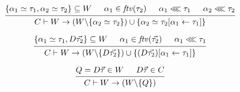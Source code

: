\documentclass[12pt]{article}
\begin{document}
\[
    \begin{prooftree}
        \hypo{\{\alpha_1 \simeq \tau_1, \alpha_2 \simeq \tau_2\} \subseteq W}
        \hypo{\alpha_1 \in \mathit{ftv}(\tau_2)}
        \hypo{\alpha_1 \lll \tau_1}
        \hypo{\alpha_2 \lll \tau_2}
        \infer4{C \vdash W \to (W \backslash \{\alpha_2 \simeq \tau_2\}) \cup \{\alpha_2 \simeq \tau_2[\alpha_1 \leftarrow \tau_1]\}}
    \end{prooftree}
\]

\[
    \begin{prooftree}
        \hypo{\{\alpha_1 \simeq \tau_1, D \vec{\tau_2}\} \subseteq W}
        \hypo{\alpha_1 \in \mathit{ftv}(\vec{\tau_2})}
        \hypo{\alpha_1 \lll \tau_1}
        \infer3{C \vdash W \to (W \backslash \{D \vec{\tau_2}\}) \cup \{(D \vec{\tau_2})[\alpha_1 \leftarrow \tau_1]\}}
    \end{prooftree}
\]

\[
    \begin{prooftree}
        \hypo{Q = D \vec{\tau} \in W}
        \hypo{D \vec{\tau} \in C}
        \infer2{C \vdash W \to (W \backslash \{Q\})}
    \end{prooftree}
\]
\end{document}
